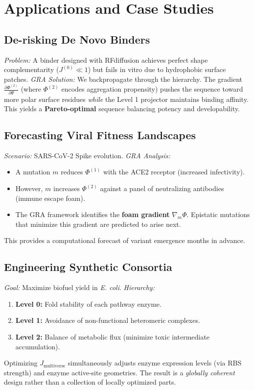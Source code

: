 \documentclass[11pt]{article}
\begin{document}
\section{Applications and Case Studies}

\subsection{De-risking De Novo Binders}
\textit{Problem:} A binder designed with RFdiffusion achieves perfect shape complementarity (\(J^{(0)} \ll 1\)) but fails in vitro due to hydrophobic surface patches.
\textit{GRA Solution:} We backpropagate through the hierarchy. The gradient \(\frac{\partial \Phi^{(2)}}{\partial \Psi}\) (where \(\Phi^{(2)}\) encodes aggregation propensity) pushes the sequence toward more polar surface residues \emph{while} the Level 1 projector maintains binding affinity. This yields a \textbf{Pareto-optimal} sequence balancing potency and developability.

\subsection{Forecasting Viral Fitness Landscapes}
\textit{Scenario:} SARS-CoV-2 Spike evolution.
\textit{GRA Analysis:}
\begin{itemize}
    \item A mutation \(m\) reduces \(\Phi^{(1)}\) with the ACE2 receptor (increased infectivity).
    \item However, \(m\) increases \(\Phi^{(2)}\) against a panel of neutralizing antibodies (immune escape foam).
    \item The GRA framework identifies the \textbf{foam gradient} \(\nabla_m \Phi\). Epistatic mutations that minimize this gradient are predicted to arise next.
\end{itemize}
This provides a computational forecast of variant emergence months in advance.

\subsection{Engineering Synthetic Consortia}
\textit{Goal:} Maximize biofuel yield in \textit{E. coli}.
\textit{Hierarchy:}
\begin{enumerate}
    \item \textbf{Level 0:} Fold stability of each pathway enzyme.
    \item \textbf{Level 1:} Avoidance of non-functional heteromeric complexes.
    \item \textbf{Level 2:} Balance of metabolic flux (minimize toxic intermediate accumulation).
\end{enumerate}
Optimizing \(J_{\text{multiverse}}\) simultaneously adjusts enzyme expression levels (via RBS strength) and enzyme active-site geometries. The result is a \emph{globally coherent} design rather than a collection of locally optimized parts.
\end{document}

